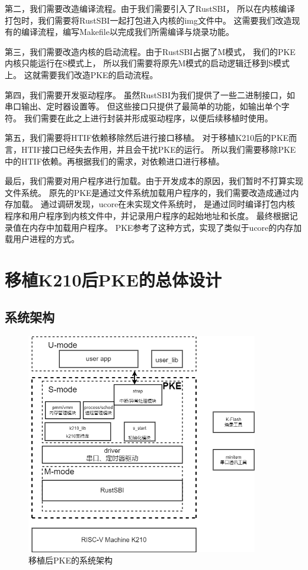 第二，我们需要改造编译流程。由于我们需要引入了RustSBI，
所以在内核编译打包时，我们需要将RustSBI一起打包进入内核的img文件中。
这需要我们改造现有的编译流程，编写Makefile以完成我们所需编译与烧录功能。

第三，我们需要改造内核的启动流程。由于RustSBI占据了M模式，
我们的PKE内核只能运行在S模式上，
所以我们需要将原先M模式的启动逻辑迁移到S模式上。
这就需要我们改造PKE的启动流程。

第四，我们需要开发驱动程序。
虽然RustSBI为我们提供了一些二进制接口，如串口输出、定时器设置等。
但这些接口只提供了最简单的功能，如输出单个字符。
我们需要在此之上进行封装并形成驱动程序，以便后续移植时使用。

第五，我们需要将HTIF依赖移除然后进行接口移植。
对于移植K210后的PKE而言，HTIF接口已经失去作用，并且会干扰PKE的运行。
所以我们需要移除PKE中的HTIF依赖。再根据我们的需求，对依赖进口进行移植。

最后，我们需要对用户程序进行加载。由于开发成本的原因，我们暂时不打算实现文件系统。
原先的PKE是通过文件系统加载用户程序的，我们需要改造成通过内存加载。
通过调研发现，ucore在未实现文件系统时，
是通过同时编译打包内核程序和用户程序到内核文件中，并记录用户程序的起始地址和长度。
最终根据记录值在内存中加载用户程序。
PKE参考了这种方式，实现了类似于ucore的内存加载用户进程的方式。

\section{移植K210后PKE的总体设计}

\subsection{系统架构}

\begin{figure}[h]
    \vspace{13pt} %
    \centering
    \includegraphics[width=0.9\textwidth]{images/after_sys_struct.drawio.png}
    \caption{移植后PKE的系统架构}\label{移植后PKE的系统架构} %
\end{figure}

